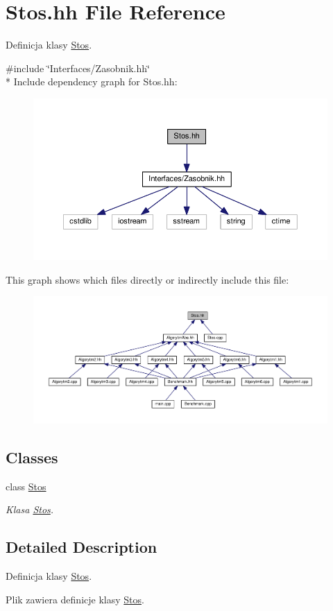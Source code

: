 \hypertarget{a00049}{}\section{Stos.\+hh File Reference}
\label{a00049}


Definicja klasy \hyperlink{a00016}{Stos}.  


{\ttfamily \#include \char`\"{}Interfaces/\+Zasobnik.\+hh\char`\"{}}\\*
Include dependency graph for Stos.\+hh\+:
\nopagebreak
\begin{figure}[H]
\begin{center}
\leavevmode
\includegraphics[width=350pt]{a00098}
\end{center}
\end{figure}
This graph shows which files directly or indirectly include this file\+:
\nopagebreak
\begin{figure}[H]
\begin{center}
\leavevmode
\includegraphics[width=350pt]{a00099}
\end{center}
\end{figure}
\subsection*{Classes}
\begin{DoxyCompactItemize}
\item 
class \hyperlink{a00016}{Stos}
\begin{DoxyCompactList}\small\item\em Klasa \hyperlink{a00016}{Stos}. \end{DoxyCompactList}\end{DoxyCompactItemize}


\subsection{Detailed Description}
Definicja klasy \hyperlink{a00016}{Stos}. 

Plik zawiera definicje klasy \hyperlink{a00016}{Stos}. 